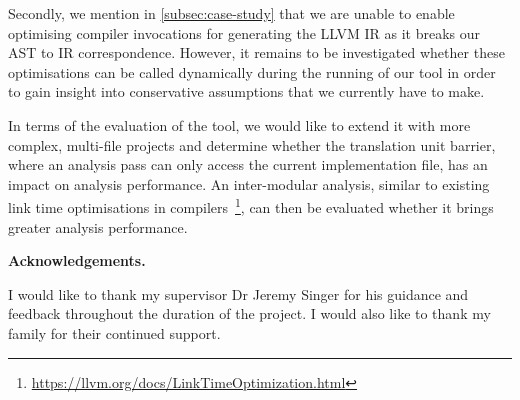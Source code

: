 \documentclass{mpaper}
\begin{document}
    Secondly, we mention in \autoref{subsec:case-study} that we are unable to enable optimising compiler invocations for generating the LLVM IR as it breaks our AST to IR correspondence. 
    However, it remains to be investigated whether these optimisations can be called dynamically during the running of our tool in order to gain insight into conservative assumptions that we currently have to make. 
    
    In terms of the evaluation of the tool, we would like to extend it with more complex, multi-file projects and determine whether the translation unit barrier, where an analysis pass can only access the current implementation file, has an impact on analysis performance.
    An inter-modular analysis, similar to existing link time optimisations in compilers~\footnote{\url{https://llvm.org/docs/LinkTimeOptimization.html}}, can then be evaluated whether it brings greater analysis performance. 
    



    \vskip8pt \noindent
    \textbf{Acknowledgements.}
    
    I would like to thank my supervisor Dr Jeremy Singer for his guidance and feedback throughout the duration of the project.
    I would also like to thank my family for their continued support.

    
    
\end{document}
